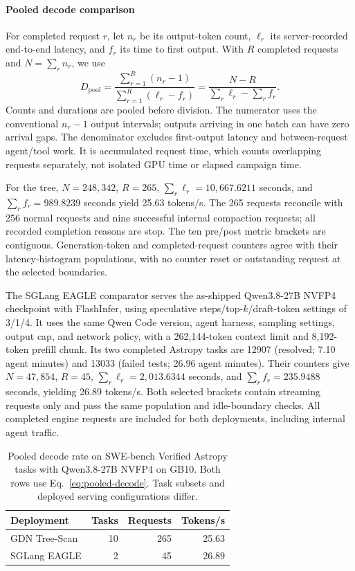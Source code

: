 \paragraph{Pooled decode comparison}
For completed request $r$, let $n_r$ be its output-token count, $\ell_r$ its server-recorded end-to-end latency, and $f_r$ its time to first output. With $R$ completed requests and $N=\sum_r n_r$, we use
\begin{equation}
 D_{\mathrm{pool}} =
 \frac{\sum_{r=1}^{R}(n_r-1)}{\sum_{r=1}^{R}(\ell_r-f_r)}
 = \frac{N-R}{\sum_r\ell_r-\sum_r f_r}.
 \label{eq:pooled-decode}
\end{equation}
Counts and durations are pooled before division. The numerator uses the conventional $n_r-1$ output intervals; outputs arriving in one batch can have zero arrival gaps. The denominator excludes first-output latency and between-request agent/tool work. It is accumulated request time, which counts overlapping requests separately, not isolated GPU time or elapsed campaign time.

For the tree, $N=248{,}342$, $R=265$, $\sum_r\ell_r=10{,}667.6211$ seconds, and $\sum_r f_r=989.8239$ seconds yield 25.63 tokens/s. The 265 requests reconcile with 256 normal requests and nine successful internal compaction requests; all recorded completion reasons are stop. The ten pre/post metric brackets are contiguous. Generation-token and completed-request counters agree with their latency-histogram populations, with no counter reset or outstanding request at the selected boundaries.

The SGLang EAGLE comparator serves the as-shipped Qwen3.8-27B NVFP4 checkpoint with FlashInfer, using speculative steps/top-$k$/draft-token settings of 3/1/4. It uses the same Qwen Code version, agent harness, sampling settings, output cap, and network policy, with a 262,144-token context limit and 8,192-token prefill chunk. Its two completed Astropy tasks are 12907 (resolved; 7.10 agent minutes) and 13033 (failed tests; 26.96 agent minutes). Their counters give $N=47{,}854$, $R=45$, $\sum_r\ell_r=2{,}013.6344$ seconds, and $\sum_r f_r=235.9488$ seconds, yielding 26.89 tokens/s. Both selected brackets contain streaming requests only and pass the same population and idle-boundary checks. All completed engine requests are included for both deployments, including internal agent traffic.

\begin{table}[t]
\caption{Pooled decode rate on SWE-bench Verified Astropy tasks with Qwen3.8-27B NVFP4 on GB10. Both rows use Eq.~\ref{eq:pooled-decode}. Task subsets and deployed serving configurations differ.}
\label{tab:pooled-decode}
\centering\small
\begin{tabular}{@{}lrrr@{}}
\toprule
Deployment & Tasks & Requests & Tokens/s \\
\midrule
GDN Tree-Scan & 10 & 265 & 25.63 \\
SGLang EAGLE & 2 & 45 & 26.89 \\
\bottomrule
\end{tabular}
\end{table}

